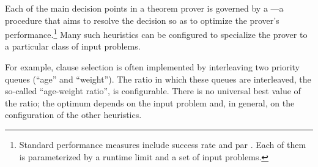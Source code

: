 

Each of the main decision points in a theorem prover is governed by a ---a procedure that aims to resolve the decision so as to optimize the prover's performance.\footnote{Standard performance measures include success rate and \gls{par} \cite{DBLP:journals/ai/BischlKKLMFHHLT16}. Each of them is parameterized by a runtime limit and a set of input problems.}
Many such heuristics can be configured to specialize the prover to a particular class of input problems.

For example, clause selection is often implemented by interleaving two priority queues (\enquote{age} and \enquote{weight}).
The ratio in which these queues are interleaved, the so-called \enquote{age-weight ratio}, is configurable.
There is no universal best value of the ratio;
the optimum depends on the input problem
\cite{DBLP:conf/cade/SchulzM16}
and, in general, on the configuration of the other heuristics.


